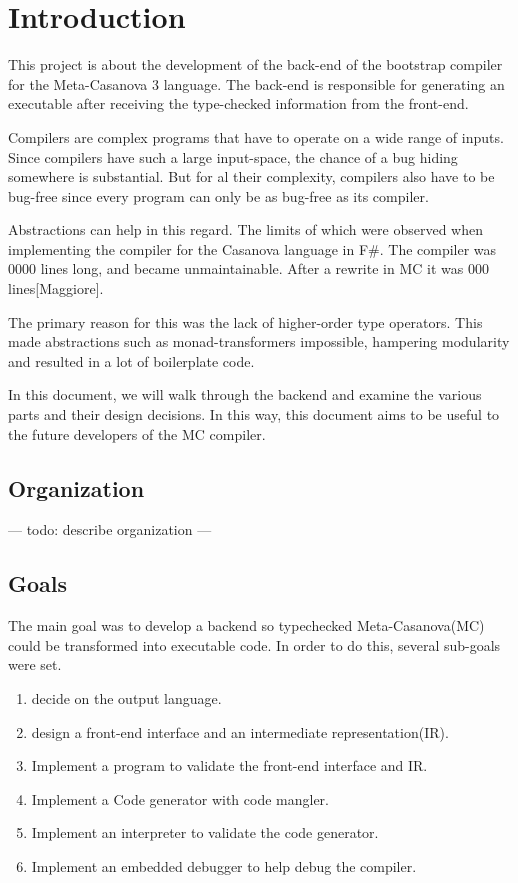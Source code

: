 \section{Introduction}
This project is about the development of the back-end of the bootstrap compiler for the Meta-Casanova 3 language.
The back-end is responsible for generating an executable after receiving the type-checked information from the front-end.

Compilers are complex programs that have to operate on a wide range of inputs.
Since compilers have such a large input-space, the chance of a bug hiding somewhere is substantial. 
But for al their complexity, compilers also have to be bug-free since every program can only be as bug-free as its compiler.

Abstractions can help in this regard.
The limits of which were observed when implementing the compiler for the Casanova language in F\#.
The compiler was 0000 lines long, and became unmaintainable.
After a rewrite in MC it was 000 lines[Maggiore].

The primary reason for this was the lack of higher-order type operators.
This made abstractions such as monad-transformers impossible, hampering modularity and resulted in a lot of boilerplate code.

In this document, we will walk through the backend and examine the various parts and their design decisions.
In this way, this document aims to be useful to the future developers of the MC compiler.

\subsection{Organization}
--- todo: describe organization ---

\subsection{Goals}

The main goal was to develop a backend so typechecked Meta-Casanova(MC) could be transformed into executable code.
In order to do this, several sub-goals were set.

\begin{enumerate}
    \item decide on the output language.
    \item design a front-end interface and an intermediate representation(IR).
    \item Implement a program to validate the front-end interface and IR.
    \item Implement a Code generator with code mangler.
    \item Implement an interpreter to validate the code generator.
    \item Implement an embedded debugger to help debug the compiler.
\end{enumerate}

